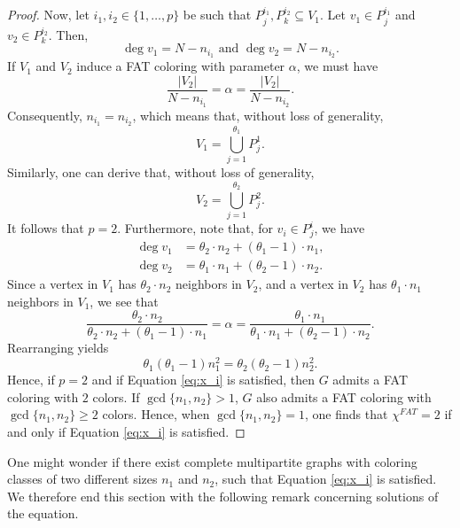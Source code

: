 \documentclass{article}
\theoremstyle{plain}
\theoremstyle{definition}
\theoremstyle{remark}
\begin{document}
\begin{proof}
    Now, let $i_1,i_2\in \{1,\ldots,p\}$ be such that $P_j^{i_1},P_k^{i_2}\subseteq V_1$. Let $v_1\in P_j^{i_1}$ and $v_2\in P_k^{i_2}$. Then,
    \[
    \deg v_1 = N - n_{i_1} \text{ and } \deg v_2 = N-n_{i_2}.
    \]
    If $V_1$ and $V_2$ induce a FAT coloring with parameter $\alpha$, we must have
    \[
    \frac{|V_2|}{N-n_{i_1}} = \alpha = \frac{|V_2|}{N-n_{i_2}}.
    \]
    Consequently, $n_{i_1} = n_{i_2}$, which means that, without loss of generality, $$V_1 = \bigcup_{j=1}^{\theta_1} P_j^1.$$ Similarly, one can derive that, without loss of generality,
    \[
    V_2 = \bigcup_{j=1}^{\theta_2} P_j^2.
    \]
    It follows that $p=2$. Furthermore, note that, for $v_i \in P_j^i$, we have
    \begin{align*}
        \deg v_1 &= \theta_2 \cdot n_2 + (\theta_1-1)\cdot n_1,\\
        \deg v_2 &= \theta_1 \cdot n_1 + (\theta_2 -1) \cdot n_2.
    \end{align*}
    Since a vertex in $V_1$ has $\theta_2\cdot n_2$ neighbors in $V_2$, and a vertex in $V_2$ has $\theta_1\cdot n_1$ neighbors in $V_1$, we see that
    \[
    \frac{\theta_2 \cdot n_2}{\theta_2 \cdot n_2 + (\theta_1-1)\cdot n_1} = \alpha = \frac{\theta_1\cdot n_1}{\theta_1 \cdot n_1 + (\theta_2-1)\cdot n_2}.
    \]
    Rearranging yields
    \begin{equation}\label{eq:x_i}
    \theta_1(\theta_1-1)n_1^2 = \theta_2(\theta_2-1)n_2^2.
    \end{equation}
    Hence, if $p=2$ and if Equation \eqref{eq:x_i} is satisfied, then $G$ admits a FAT coloring with $2$ colors. If $\gcd\{n_1,n_2\}>1$, $G$ also admits a FAT coloring with $\gcd\{n_1,n_2\}\geq 2$ colors. Hence, when $\gcd\{n_1,n_2\}=1$, one finds that $\chi^{FAT} = 2$ if and only if Equation \eqref{eq:x_i} is satisfied.
\end{proof}
One might wonder if there exist complete multipartite graphs with coloring classes of two different sizes $n_1$ and $n_2$, such that Equation \eqref{eq:x_i} is satisfied. We therefore end this section with the following remark concerning solutions of the equation.\\
\end{document}

